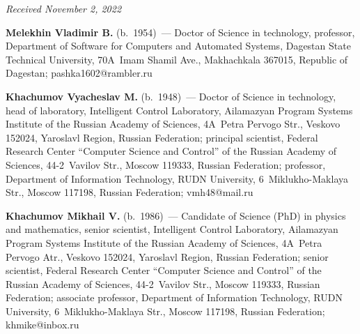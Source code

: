 \vspace*{-6pt}

\hfill{\small\textit{Received November 2, 2022}} 

\vspace*{-18pt}

\Contr

\noindent
\textbf{Melekhin Vladimir B.} (b.\ 1954)~--- Doctor of Science in technology, professor, 
Department of Software for Computers and Automated Systems, Dagestan State Technical 
University, 70A~Imam Shamil Ave., Makhachkala 367015, Republic of Dagestan; 
\mbox{pashka1602@rambler.ru}

\vspace*{3pt}

\noindent
\textbf{Khachumov Vyacheslav M.} (b.\ 1948)~--- Doctor of Science in technology, 
head of laboratory, Intelligent Control Laboratory, Ailamazyan Program Systems Institute of the
Russian Academy of Sciences, 4A~Petra Pervogo Str., Veskovo 152024, Yaroslavl Region, Russian 
Federation; principal scientist, Federal Research Center ``Computer Science and Control'' of the 
Russian Academy of Sciences, 44-2~Vavilov Str., Moscow 119333, Russian Federation; professor, 
Department of Information Technology, RUDN University, 6~Miklukho-Maklaya Str., Moscow 
117198, Russian Federation; \mbox{vmh48@mail.ru}
\vspace*{3pt}

\noindent
\textbf{Khachumov Mikhail V.} (b.\ 1986)~--- Candidate of Science (PhD) in physics and 
mathematics, senior scientist, Intelligent Control Laboratory, Ailamazyan Program Systems 
Institute of the Russian Academy of Sciences, 4A~Petra Pervogo Atr., Veskovo 152024, Yaroslavl 
Region, Russian Federation; senior scientist, Federal Research Center ``Computer Science and 
Control'' of the Russian Academy of Sciences, 44-2~Vavilov Str., Moscow 119333, Russian 
Federation; associate professor, Department of Information Technology, RUDN University,  
6~Miklukho-Maklaya Str., Moscow 117198, Russian Federation; \mbox{khmike@inbox.ru}

  


\label{end\stat}

\renewcommand{\bibname}{\protect\rm Литература} 
    